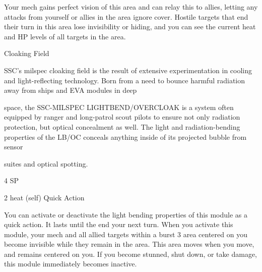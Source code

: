          Your mech gains perfect vision of this area and can relay this to allies, letting any attacks
         from yourself or allies in the area ignore cover. Hostile targets that end their turn in this
          area lose invisibility or hiding, and you can see the current heat and HP levels of all
         targets in the area.


Cloaking Field

SSC’s milspec cloaking field is the result of extensive experimentation in cooling and light-reflecting
technology. Born from a need to bounce harmful radiation away from ships and EVA modules in deep

space, the SSC-MILSPEC LIGHTBEND/OVERCLOAK is a system often equipped by ranger and long-patrol
scout pilots to ensure not only radiation protection, but optical concealment as well. The light and
radiation-bending properties of the LB/OC conceals anything inside of its projected bubble from sensor

suites and optical spotting.

4 SP

2 heat (self)
Quick Action

You can activate or deactivate the light bending properties of this module as a quick action. It
lasts until the end your next turn. When you activate this module, your mech and all allied targets
within a burst 3 area centered on you become invisible while they remain in the area. This area
moves when you move, and remains centered on you. If you become stunned, shut down, or
take damage, this module immediately becomes inactive.
